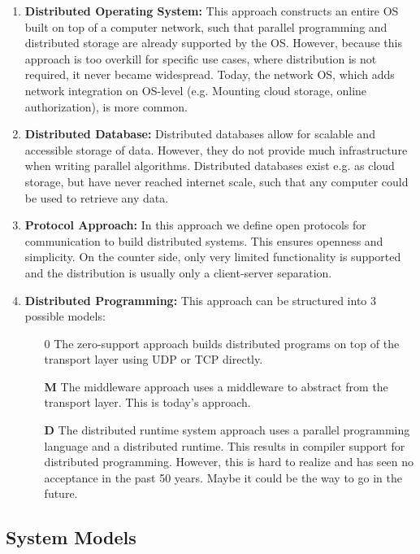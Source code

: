 \begin{enumerate}
    \item \textbf{Distributed Operating System:} This approach constructs an entire \ac{OS} built on top of a computer network, such that parallel programming and distributed storage are already supported by the \ac{OS}. However, because this approach is too overkill for specific use cases, where distribution is not required, it never became widespread. Today, the network \ac{OS}, which adds network integration on \ac{OS}-level (e.g. Mounting cloud storage, online authorization), is more common.
    \item \textbf{Distributed Database:} Distributed databases allow for scalable and accessible storage of data. However, they do not provide much infrastructure when writing parallel algorithms. Distributed databases exist e.g. as cloud storage, but have never reached internet scale, such that any computer could be used to retrieve any data.
    \item \textbf{Protocol Approach:} In this approach we define open protocols for communication to build distributed systems. This ensures openness and simplicity. On the counter side, only very limited functionality is supported and the distribution is usually only a client-server separation.
    \item \textbf{Distributed Programming:} This approach can be structured into 3 possible models:
          \begin{itemize}
              \item[$0$] The zero-support approach builds distributed programs on top of the transport layer using UDP or TCP directly.
              \item[\textbf{M}] The middleware approach uses a middleware to abstract from the transport layer. This is today's approach.
              \item[\textbf{D}] The distributed runtime system approach uses a parallel programming language and a distributed runtime. This results in compiler support for distributed programming. However, this is hard to realize and has seen no acceptance in the past 50 years. Maybe it could be the way to go in the future.
          \end{itemize}
\end{enumerate}

\subsection{System Models}

